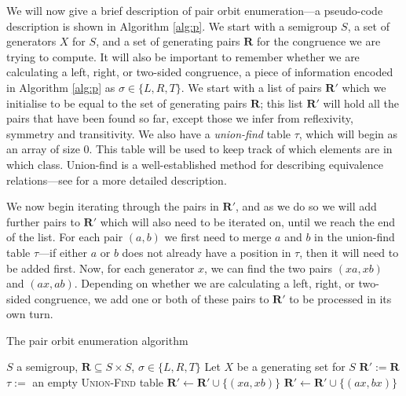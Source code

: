 We will now give a brief description of pair orbit enumeration---a pseudo-code
description is shown in Algorithm \ref{alg:p}.  We start with a semigroup $S$, a
set of generators $X$ for $S$, and a set of generating pairs $\mathbf{R}$ for
the congruence we are trying to compute.  It will also be important to remember
whether we are calculating a left, right, or two-sided congruence, a piece of
information encoded in Algorithm \ref{alg:p} as $\sigma \in \{L,R,T\}$.  We
start with a list of pairs $\mathbf{R}'$ which we initialise to be equal
to the set of generating pairs $\mathbf{R}$; this list $\mathbf{R}'$ will hold
all the pairs that have been found so far, except those we infer from
reflexivity, symmetry and transitivity.  We also have a \textit{union-find}
table $\tau$, which will begin as an array of size $0$.  This table will be used
to keep track of which elements are in which class.  Union-find is a
well-established method for describing equivalence relations---see
\cite{union-find} for a more detailed description.

We now begin iterating through the pairs in $\mathbf{R}'$, and as we do so we
will add further pairs to $\mathbf{R}'$ which will also need to be iterated on,
until we reach the end of the list.  For each pair $(a,b)$ we first need to
merge $a$ and $b$ in the union-find table $\tau$---if either $a$ or $b$ does not
already have a position in $\tau$, then it will need to be added first.  Now,
for each generator $x$, we can find the two pairs $(xa,xb)$ and $(ax,ab)$.
Depending on whether we are calculating a left, right, or two-sided congruence,
we add one or both of these pairs to $\mathbf{R}'$ to be processed in its own
turn.

\begin{algorithm}
\caption{The pair orbit enumeration algorithm}
\label{alg:p}
\begin{algorithmic}[1]
\Require $S$ a semigroup,
         $\mathbf{R} \subseteq S \times S$,
         $\sigma \in \{L, R, T\}$
\State Let $X$ be a generating set for $S$
\State $\mathbf{R}' := \mathbf{R}$
\State $\tau :=$ an empty \textsc{Union-Find} table
  \State {}
      \State $\mathbf{R}' \gets \mathbf{R}' \cup \{(xa, xb)\}$
    \EndIf
      \State $\mathbf{R}' \gets \mathbf{R}' \cup \{(ax, bx)\}$
    \EndIf
  \EndFor
\EndFor
\EndProcedure
\end{algorithmic}
\end{algorithm}

